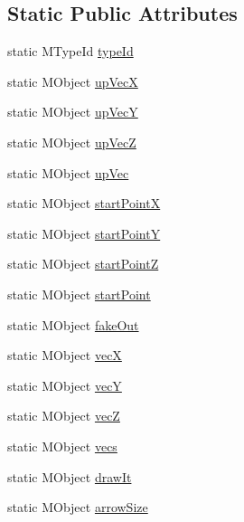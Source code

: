 \subsection*{Static Public Attributes}
\begin{DoxyCompactItemize}
\item 
static M\-Type\-Id \hyperlink{class_m_g__vector_g_l_acca8150a834863494fd5f1b00680289e}{type\-Id}
\item 
static M\-Object \hyperlink{class_m_g__vector_g_l_a70c7ff57dc885d2fed64e61fa6dce7c4}{up\-Vec\-X}
\item 
static M\-Object \hyperlink{class_m_g__vector_g_l_abccaa6f4f93a98f68c0aec200763f6c5}{up\-Vec\-Y}
\item 
static M\-Object \hyperlink{class_m_g__vector_g_l_aa5348daa3385f54237190545cdf21009}{up\-Vec\-Z}
\item 
static M\-Object \hyperlink{class_m_g__vector_g_l_a9fa637bb5b24532d768f5b8912c3f92e}{up\-Vec}
\item 
static M\-Object \hyperlink{class_m_g__vector_g_l_ae7c3a0612e7db7b56e6e96c0179aefc6}{start\-Point\-X}
\item 
static M\-Object \hyperlink{class_m_g__vector_g_l_af1d06d50730959946fc5db507eefa3aa}{start\-Point\-Y}
\item 
static M\-Object \hyperlink{class_m_g__vector_g_l_a00e63c6a4cf63e7c71cc22e094578470}{start\-Point\-Z}
\item 
static M\-Object \hyperlink{class_m_g__vector_g_l_ac0ca586f36cae208f5fb0655d5f5a534}{start\-Point}
\item 
static M\-Object \hyperlink{class_m_g__vector_g_l_ac9e29eb01772ab64b67fe0ac130dceef}{fake\-Out}
\item 
static M\-Object \hyperlink{class_m_g__vector_g_l_a6eeaca2cfdf01a1cde7727a7d02e9fb8}{vec\-X}
\item 
static M\-Object \hyperlink{class_m_g__vector_g_l_ab83a515ef8a0389db4fffdd27deb0a15}{vec\-Y}
\item 
static M\-Object \hyperlink{class_m_g__vector_g_l_a793496afb749c8d022fb487e7cb7ef50}{vec\-Z}
\item 
static M\-Object \hyperlink{class_m_g__vector_g_l_a7e8fcd12774565e52cfc9a088426fda5}{vecs}
\item 
static M\-Object \hyperlink{class_m_g__vector_g_l_a5d59b4c3dfc50250558acfabca45a260}{draw\-It}
\item 
static M\-Object \hyperlink{class_m_g__vector_g_l_a51ce57b6d4cac43cf6b9fbdf377691c4}{arrow\-Size}
\end{DoxyCompactItemize}


